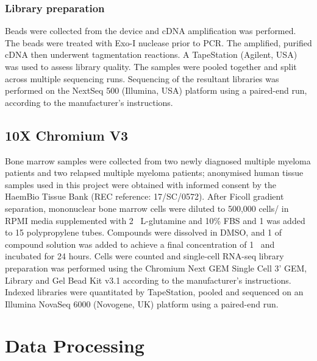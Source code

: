 \subsubsection{Library preparation}
Beads were collected from the device and cDNA amplification was performed.
The beads were treated with Exo-I nuclease prior to PCR.
The amplified, purified cDNA then underwent tagmentation reactions.
A TapeStation (Agilent, USA) was used to assess library quality.
The samples were pooled together and split across multiple sequencing runs.
Sequencing of the resultant libraries was performed on the NextSeq 500 (Illumina, USA) platform using a paired-end run, according to the manufacturer's instructions.

\subsection{10X Chromium V3}\label{subsec:10x_method}
Bone marrow samples were collected from two newly diagnosed multiple myeloma patients and two relapsed multiple myeloma patients;
anonymised human tissue samples used in this project were obtained with informed consent by the HaemBio Tissue Bank (REC reference: 17/SC/0572).
After Ficoll gradient separation, mononuclear bone marrow cells were diluted to 500,000 cells/\ml{} in RPMI media supplemented with 2\si{\milli\Molar}
L-glutamine and 10\% FBS and 1\ml{} was added to 15\ml{} polypropylene tubes.
Compounds were dissolved in DMSO, and 1\ul{} of compound solution was added to achieve a final concentration of 1\si{\micro\Molar} and incubated for 24 hours.
Cells were counted and single-cell RNA-seq library preparation was performed using the Chromium Next GEM Single Cell 3' GEM, Library and Gel Bead Kit v3.1 according to the manufacturer's instructions.
Indexed libraries were quantitated by TapeStation, pooled and sequenced on an Illumina NovaSeq 6000 (Novogene, UK) platform using a paired-end run.

%

\section{Data Processing}\label{sec:data_processing}
